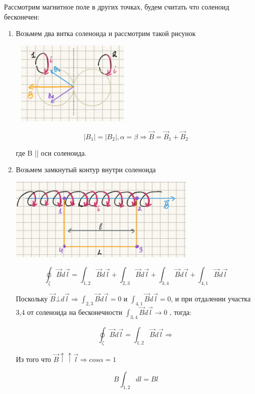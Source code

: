 \documentclass[../main.tex]{subfiles}
\begin{document}
Рассмотрим магнитное поле в других точках, будем считать что соленоид бесконечен:
\begin{enumerate}
    \item Возьмем два витка соленоида и рассмотрим такой рисунок
          \begin{center}
              \includegraphics[width=6cm, height=4cm]{../img/soly_1.png}
          \end{center}
          \[|B_1| = |B_2| , \alpha = \beta \Rightarrow \vec B = \vec B_1 + \vec B_2\]
          \begin{center}
              где B || оси соленоида.
          \end{center}

    \item Возьмем замкнутый контур внутри соленоида
          \begin{center}
              \includegraphics[width=9cm, height=4cm]{../img/soly_2.png}
          \end{center}
          \[ \oint_{\zeta} \vec B d \vec l = \int_{1,2} \vec B d \vec l + \int_{2,3} \vec B d \vec l + \int_{3,4} \vec B d \vec l + \int_{4,1} \vec B d \vec l\]

          \vspace{5px}

          Поскольку $\vec B \bot d \vec l \Rightarrow \int_{2,3} \vec B d \vec l = 0$ и $\int_{4,1} \vec B d \vec l = 0$,
          и при отдалении участка 3,4 от соленоида на бесконечности $\int_{3,4} \vec B d \vec l \to 0$ ,
          тогда:

          \[\oint_{\zeta} \vec B d \vec l = \int_{1,2} \vec B d \vec l \Rightarrow\]
          \begin{center}
              Из того что $\vec B \uparrow \uparrow \vec l \Rightarrow cos{\alpha} = 1$
          \end{center}
          \[B\int_{1,2} dl = Bl\]


\end{enumerate}
\end{document}
